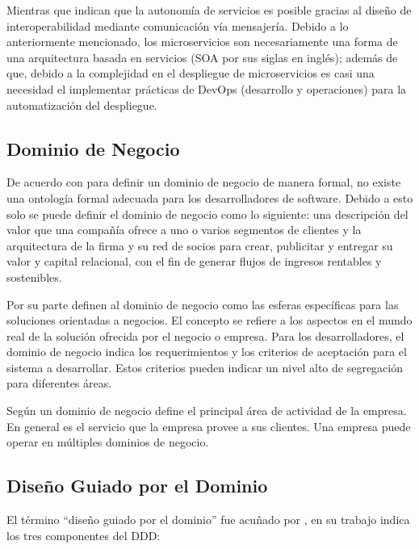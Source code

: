 Mientras que \cite{nadareishvili2016microservice} indican que la autonomía de servicios es posible
gracias al diseño de interoperabilidad mediante comunicación vía mensajería.
Debido a lo anteriormente mencionado, los microservicios son necesariamente una forma de una
arquitectura basada en servicios (SOA por sus siglas en inglés); además de que, debido a la
complejidad en el despliegue de microservicios es casi una necesidad el implementar prácticas de
DevOps (desarrollo y operaciones) para la automatización del despliegue.


\subsection{Dominio de Negocio}

De acuerdo con \cite{bosselmann2014domain} para definir un dominio de negocio de manera formal,
no existe una ontología formal adecuada para los desarrolladores de software.
Debido a esto solo se puede definir el dominio de negocio como lo siguiente: una descripción
del valor que una compañía ofrece a uno o varios segmentos de clientes y la arquitectura de
la firma y su red de socios para crear, publicitar y entregar su valor y capital relacional,
con el fin de generar flujos de ingresos rentables y sostenibles.

Por su parte \cite{heidari2021ontology} definen al dominio de negocio como las esferas específicas
para las soluciones orientadas a negocios.
El concepto se refiere a los aspectos en el mundo real de la solución ofrecida por el negocio o empresa.
Para los desarrolladores, el dominio de negocio indica los requerimientos y los criterios de aceptación
para el sistema a desarrollar.
Estos criterios pueden indicar un nivel alto de segregación para diferentes áreas.

Según \cite{khononov2021learning} un dominio de negocio define el principal área de actividad de
la empresa. En general es el servicio que la empresa provee a sus clientes.
Una empresa puede operar en múltiples dominios de negocio.


\subsection{Diseño Guiado por el Dominio}

El término ``diseño guiado por el dominio'' fue acuñado por \cite{evans2004domain}, en su trabajo
indica los tres componentes del DDD:

